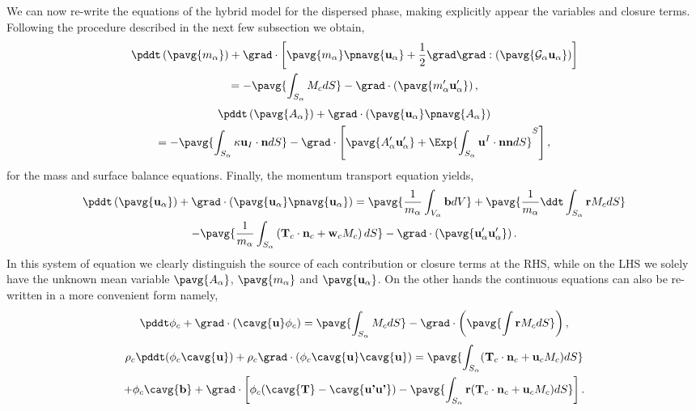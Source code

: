 We can now re-write the equations of the hybrid model for the dispersed phase, making explicitly appear the variables and closure terms.
Following the procedure described in the next few subsection we obtain, 
\begin{multline*}
    \pddt   \left(\pavg{m_\alpha}\right)
    + \grad \cdot \left[\pavg{m_\alpha} \pnavg{\textbf{u}_\alpha} 
    + \frac{1}{2}\grad\grad : (\pavg{ \mathcal{G}_\alpha\textbf{u}_\alpha})\right] \\
    = -\pavg{\int_{S_\alpha} M_c d S}
    - \grad \cdot \left(\pavg{m_\alpha' \textbf{u}_\alpha'} \right) ,
\end{multline*}
\begin{multline*}
    \pddt \left(\pavg{A_\alpha}\right)
    + \grad \cdot \left(\pavg{\textbf{u}_\alpha} \pnavg{A_\alpha}\right)\\
    = -\pavg{\int_{S_\alpha} \kappa\textbf{u}_I\cdot \textbf{n} dS }
    - \grad \cdot \left[
        \pavg{A_\alpha' \textbf{u}_\alpha'}
        +\Exp{ \int_{S_\alpha} \textbf{u}^I \cdot\textbf{nn} dS}^S
    \right],
\end{multline*}
for the mass and surface balance equations. 
Finally, the momentum transport equation yields,
\begin{multline}
    \pddt   \left(\pavg{\textbf{u}_\alpha}\right)
    + \grad \cdot \left(\pavg{\textbf{u}_\alpha}\pnavg{\textbf{u}_\alpha}\right)
    = \pavg{\frac{1}{m_\alpha}\int_{V_\alpha} \textbf{b} dV}
    + \pavg{\frac{1}{m_\alpha}\ddt \int_{S_\alpha} \textbf{r}M_c dS}\\
    - \pavg{\frac{1}{m_\alpha}\int_{S_\alpha} \left(\textbf{T}_c  \cdot \textbf{n}_c  + \textbf{w}_c M_c \right) dS}
    - \grad \cdot \left(\pavg{\textbf{u}_\alpha' \textbf{u}_\alpha'}\right). 
\end{multline}
In this system of equation we clearly distinguish the source of each contribution or closure terms at the RHS, while on the LHS we solely have the unknown mean variable $\pavg{A_\alpha}$, $\pavg{m_\alpha}$ and $\pavg{\textbf{u}_\alpha}$. 
On the other hands the continuous equations can also be re-written in a more convenient form namely,
\begin{equation*}
    \pddt \phi_c 
    + \grad \cdot \left(
        \cavg{\textbf{u}}\phi_c 
    \right) 
    =  \pavg{\int_{S_\alpha} M_c dS} 
    - \grad \cdot \left(
        \pavg{\int \textbf{r} M_c dS}
    \right),
\end{equation*}
\begin{multline*}
    \rho_c \pddt (\phi_c\cavg{\textbf{u}}) 
    +\rho_c \grad \cdot ( \phi_c \cavg{\textbf{u}}\cavg{\textbf{u}})
    = \pavg{\int_{S_\alpha} (\textbf{T}_c  \cdot \textbf{n}_c + \textbf{u}_c M_c) d S}\\
    +\phi_c\cavg{\textbf{b}}
    + \grad\cdot\left[
    \phi_c (\cavg{\textbf{T}}
    - \cavg{\textbf{u'u'}})
    - \pavg{\int_{S_\alpha} \textbf{r} (\textbf{T}_c  \cdot \textbf{n}_c + \textbf{u}_c M_c)dS}
    \right].
\end{multline*}



